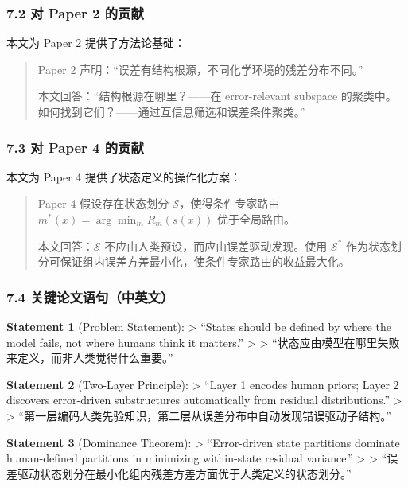 \documentclass[
  12pt,
]{ctexart}
\begin{document}
\subsubsection{7.2 对 Paper 2
的贡献}\label{ux5bf9-paper-2-ux7684ux8d21ux732e}

本文为 Paper 2 提供了方法论基础：

\begin{quote}
Paper 2 声明：``误差有结构根源，不同化学环境的残差分布不同。''

本文回答：``结构根源在哪里？------在 error-relevant subspace 的聚类中。
如何找到它们？------通过互信息筛选和误差条件聚类。''
\end{quote}

\subsubsection{7.3 对 Paper 4
的贡献}\label{ux5bf9-paper-4-ux7684ux8d21ux732e}

本文为 Paper 4 提供了状态定义的操作化方案：

\begin{quote}
Paper 4 假设存在状态划分 \(\mathcal{S}\)，使得条件专家路由
\(m^*(x) = \arg\min_m R_m(s(x))\) 优于全局路由。

本文回答：\(\mathcal{S}\) 不应由人类预设，而应由误差驱动发现。使用
\(\mathcal{S}^*\)
作为状态划分可保证组内误差方差最小化，使条件专家路由的收益最大化。
\end{quote}

\subsubsection{7.4
关键论文语句（中英文）}\label{ux5173ux952eux8bbaux6587ux8bedux53e5ux4e2dux82f1ux6587}

\textbf{Statement 1} (Problem Statement): \textgreater{} ``States should
be defined by where the model fails, not where humans think it
matters.'' \textgreater{} \textgreater{}
``状态应由模型在哪里失败来定义，而非人类觉得什么重要。''

\textbf{Statement 2} (Two-Layer Principle): \textgreater{} ``Layer 1
encodes human priors; Layer 2 discovers error-driven substructures
automatically from residual distributions.'' \textgreater{}
\textgreater{}
``第一层编码人类先验知识，第二层从误差分布中自动发现错误驱动子结构。''

\textbf{Statement 3} (Dominance Theorem): \textgreater{} ``Error-driven
state partitions dominate human-defined partitions in minimizing
within-state residual variance.'' \textgreater{} \textgreater{}
``误差驱动状态划分在最小化组内残差方差方面优于人类定义的状态划分。''
\end{document}
